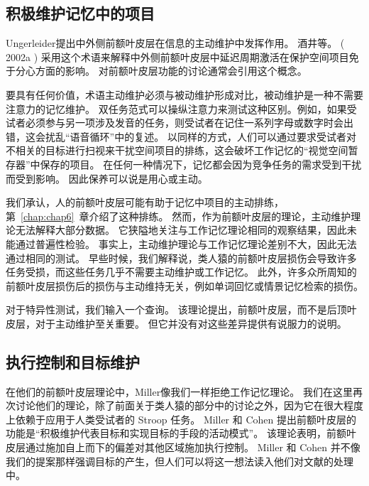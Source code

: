 \subsection{积极维护记忆中的项目}

Ungerleider\cite{ungerleider1995functional}提出中外侧前额叶皮层在信息的主动维护中发挥作用。 
酒井等。 ( 2002a ) 采用这个术语来解释中外侧前额叶皮层中延迟周期激活在保护空间项目免于分心方面的影响。 对前额叶皮层功能的讨论通常会引用这个概念\cite{d2007cognitive}。
\par


要具有任何价值，术语主动维护必须与被动维护形成对比，被动维护是一种不需要注意力的记忆维护。
双任务范式可以操纵注意力来测试这种区别。例如，如果受试者必须参与另一项涉及发音的任务，则受试者在记住一系列字母或数字时会出错，这会扰乱“语音循环”中的复述\cite{baddeley1992working}。
以同样的方式，人们可以通过要求受试者对不相关的目标进行扫视来干扰空间项目的排练，这会破坏工作记忆的“视觉空间暂存器”中保存的项目\cite{guerard2009processing}。
在任何一种情况下，记忆都会因为竞争任务的需求受到干扰而受到影响。
因此保养可以说是用心或主动。
\par


我们承认，人的前额叶皮层可能有助于记忆中项目的主动排练，第~\ref{chap:chap6}~章介绍了这种排练。
然而，作为前额叶皮层的理论，主动维护理论无法解释大部分数据。
它狭隘地关注与工作记忆理论相同的观察结果，因此未能通过普遍性检验。
事实上，主动维护理论与工作记忆理论差别不大，因此无法通过相同的测试。
早些时候，我们解释说，类人猿的前额叶皮层损伤会导致许多任务受损，而这些任务几乎不需要主动维护或工作记忆。
此外，许多众所周知的 前额叶皮层损伤后的损伤与主动维持无关，例如单词回忆或情景记忆检索的损伤。
\par


对于特异性测试，我们输入一个查询。
该理论提出，前额叶皮层，而不是后顶叶皮层，对于主动维护至关重要。
但它并没有对这些差异提供有说服力的说明。



\subsection{执行控制和目标维护}

在他们的前额叶皮层理论中，Miller\cite{miller2001integrative}像我们一样拒绝工作记忆理论。
我们在这里再次讨论他们的理论，除了前面关于类人猿的部分中的讨论之外，因为它在很大程度上依赖于应用于人类受试者的 Stroop 任务。
Miller 和 Cohen 提出前额叶皮层的功能是“积极维护代表目标和实现目标的手段的活动模式”。
该理论表明，前额叶皮层通过施加自上而下的偏差对其他区域施加执行控制。
Miller 和 Cohen 并不像我们的提案那样强调目标的产生，但人们可以将这一想法读入他们对文献的处理中。
\par



